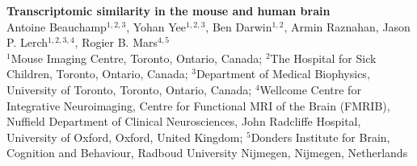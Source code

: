 
\LARGE{\textbf{Transcriptomic similarity in the mouse and human brain}}\\

\large
Antoine Beauchamp$^{1,2,3}$, Yohan Yee$^{1,2,3}$, Ben Darwin$^{1,2}$, Armin Raznahan, Jason P. Lerch$^{1,2,3,4}$, Rogier B. Mars$^{4,5}$\\

\small
$^1$Mouse Imaging Centre, Toronto, Ontario, Canada; $^2$The Hospital for Sick Children, Toronto, Ontario, Canada; $^3$Department of Medical Biophysics, University of Toronto, Toronto, Ontario, Canada; $^4$Wellcome Centre for Integrative Neuroimaging, Centre for Functional MRI of the Brain (FMRIB), Nuffield Department of Clinical Neurosciences, John Radcliffe Hospital, University of Oxford, Oxford, United Kingdom; $^5$Donders Institute for Brain, Cognition and Behaviour, Radboud University Nijmegen, Nijmegen, Netherlands


\normalsize